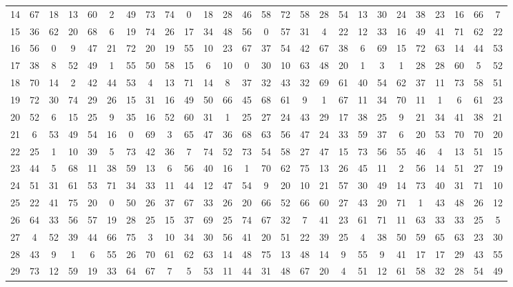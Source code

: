 \begin{table}
\begin{tabular}{c c c c c c c c c c c c c c c c c c c c c c c c c c }
14 & 67 & 18 & 13 & 60 & 2 & 49 & 73 & 74 & 0 & 18 & 28 & 46 & 58 & 72 & 58 & 28 & 54 & 13 & 30 & 24 & 38 & 23 & 16 & 66 & 7 \\
15 & 36 & 62 & 20 & 68 & 6 & 19 & 74 & 26 & 17 & 34 & 48 & 56 & 0 & 57 & 31 & 4 & 22 & 12 & 33 & 16 & 49 & 41 & 71 & 62 & 22 \\
16 & 56 & 0 & 9 & 47 & 21 & 72 & 20 & 19 & 55 & 10 & 23 & 67 & 37 & 54 & 42 & 67 & 38 & 6 & 69 & 15 & 72 & 63 & 14 & 44 & 53 \\
17 & 38 & 8 & 52 & 49 & 1 & 55 & 50 & 58 & 15 & 6 & 10 & 0 & 30 & 10 & 63 & 48 & 20 & 1 & 3 & 1 & 28 & 28 & 60 & 5 & 52 \\
18 & 70 & 14 & 2 & 42 & 44 & 53 & 4 & 13 & 71 & 14 & 8 & 37 & 32 & 43 & 32 & 69 & 61 & 40 & 54 & 62 & 37 & 11 & 73 & 58 & 51 \\
19 & 72 & 30 & 74 & 29 & 26 & 15 & 31 & 16 & 49 & 50 & 66 & 45 & 68 & 61 & 9 & 1 & 67 & 11 & 34 & 70 & 11 & 1 & 6 & 61 & 23 \\
20 & 52 & 6 & 15 & 25 & 9 & 35 & 16 & 52 & 60 & 31 & 1 & 25 & 27 & 24 & 43 & 29 & 17 & 38 & 25 & 9 & 21 & 34 & 41 & 38 & 21 \\
21 & 6 & 53 & 49 & 54 & 16 & 0 & 69 & 3 & 65 & 47 & 36 & 68 & 63 & 56 & 47 & 24 & 33 & 59 & 37 & 6 & 20 & 53 & 70 & 70 & 20 \\
22 & 25 & 1 & 10 & 39 & 5 & 73 & 42 & 36 & 7 & 74 & 52 & 73 & 54 & 58 & 27 & 47 & 15 & 73 & 56 & 55 & 46 & 4 & 13 & 51 & 15 \\
23 & 44 & 5 & 68 & 11 & 38 & 59 & 13 & 6 & 56 & 40 & 16 & 1 & 70 & 62 & 75 & 13 & 26 & 45 & 11 & 2 & 56 & 14 & 51 & 27 & 19 \\
24 & 51 & 31 & 61 & 53 & 71 & 34 & 33 & 11 & 44 & 12 & 47 & 54 & 9 & 20 & 10 & 21 & 57 & 30 & 49 & 14 & 73 & 40 & 31 & 71 & 10 \\
25 & 22 & 41 & 75 & 20 & 0 & 50 & 26 & 37 & 67 & 33 & 26 & 20 & 66 & 52 & 66 & 60 & 27 & 43 & 20 & 71 & 1 & 43 & 48 & 26 & 12 \\
26 & 64 & 33 & 56 & 57 & 19 & 28 & 25 & 15 & 37 & 69 & 25 & 74 & 67 & 32 & 7 & 41 & 23 & 61 & 71 & 11 & 63 & 33 & 33 & 25 & 5 \\
27 & 4 & 52 & 39 & 44 & 66 & 75 & 3 & 10 & 34 & 30 & 56 & 41 & 20 & 51 & 22 & 39 & 25 & 4 & 38 & 50 & 59 & 65 & 63 & 23 & 30 \\
28 & 43 & 9 & 1 & 6 & 55 & 26 & 70 & 61 & 62 & 63 & 14 & 48 & 75 & 13 & 48 & 14 & 9 & 55 & 9 & 41 & 17 & 17 & 29 & 43 & 55 \\
29 & 73 & 12 & 59 & 19 & 33 & 64 & 67 & 7 & 5 & 53 & 11 & 44 & 31 & 48 & 67 & 20 & 4 & 51 & 12 & 61 & 58 & 32 & 28 & 54 & 49 \\

\end{tabular}
\end{table}
